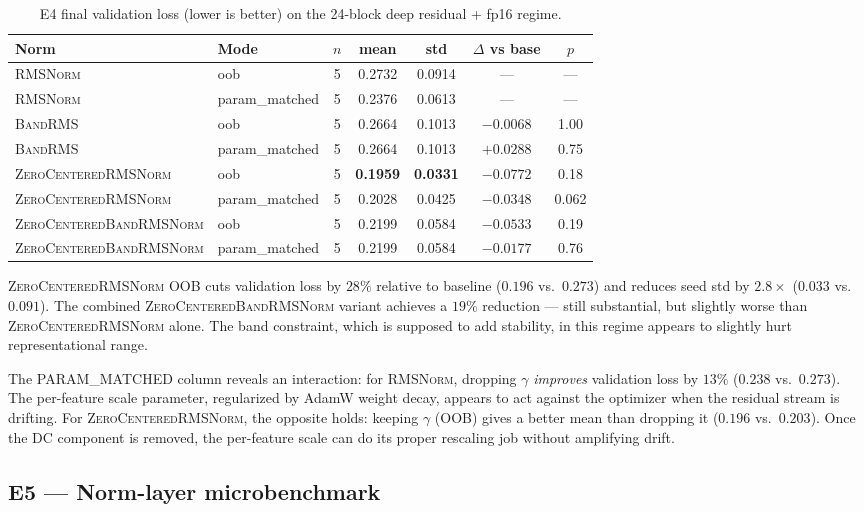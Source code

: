 \documentclass{article}
\newcommand{\rms}{\textsc{RMSNorm}}
\newcommand{\bandrms}{\textsc{BandRMS}}
\newcommand{\zcrms}{\textsc{ZeroCentered}\-\textsc{RMSNorm}}
\newcommand{\zcband}{\textsc{ZeroCentered}\-\textsc{BandRMSNorm}}
\begin{document}
\begin{table}[H]
\centering
\caption{E4 final validation loss (lower is better) on the 24-block deep residual + fp16 regime.}
\label{tab:e4}
\renewcommand{\arraystretch}{1.15}
\begin{tabular}{llccccc}
\toprule
\textbf{Norm} & \textbf{Mode} & \textbf{$n$} & \textbf{mean} & \textbf{std} & \textbf{$\Delta$ vs base} & \textbf{$p$} \\
\midrule
\rms{}            & oob            & 5 & 0.2732 & 0.0914 & --- & --- \\
\rms{}            & param\_matched & 5 & 0.2376 & 0.0613 & --- & --- \\
\bandrms{}        & oob            & 5 & 0.2664 & 0.1013 & $-0.0068$ & 1.00 \\
\bandrms{}        & param\_matched & 5 & 0.2664 & 0.1013 & $+0.0288$ & 0.75 \\
\zcrms{}          & oob            & 5 & \textbf{0.1959} & \textbf{0.0331} & $-0.0772$ & 0.18 \\
\zcrms{}          & param\_matched & 5 & 0.2028 & 0.0425 & $-0.0348$ & 0.062 \\
\zcband{}         & oob            & 5 & 0.2199 & 0.0584 & $-0.0533$ & 0.19 \\
\zcband{}         & param\_matched & 5 & 0.2199 & 0.0584 & $-0.0177$ & 0.76 \\
\bottomrule
\end{tabular}
\end{table}

\zcrms{} OOB cuts validation loss by $28\%$ relative to baseline ($0.196$ vs.\ $0.273$) and reduces seed std by $2.8\times$ ($0.033$ vs.\ $0.091$).
The combined \zcband{} variant achieves a $19\%$ reduction --- still substantial, but slightly worse than \zcrms{} alone.
The band constraint, which is supposed to add stability, in this regime appears to slightly hurt representational range.

The PARAM\_MATCHED column reveals an interaction: for \rms{}, dropping $\gamma$ \emph{improves} validation loss by $13\%$ ($0.238$ vs.\ $0.273$).
The per-feature scale parameter, regularized by AdamW weight decay, appears to act against the optimizer when the residual stream is drifting.
For \zcrms{}, the opposite holds: keeping $\gamma$ (OOB) gives a better mean than dropping it ($0.196$ vs.\ $0.203$).
Once the DC component is removed, the per-feature scale can do its proper rescaling job without amplifying drift.

\subsection{E5 --- Norm-layer microbenchmark}
\label{sec:e5}
\end{document}
